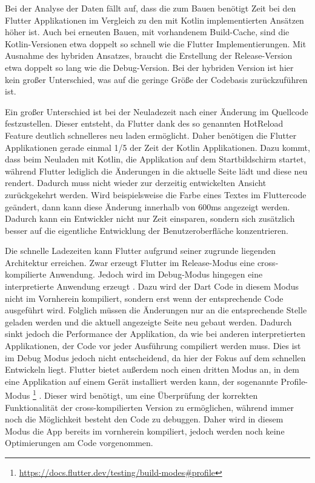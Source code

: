 Bei der Analyse der Daten fällt auf, dass die zum Bauen benötigt Zeit bei den Flutter Applikationen im Vergleich zu den mit Kotlin implementierten Ansätzen höher ist. 
Auch bei erneuten Bauen, mit vorhandenem Build-Cache, sind die Kotlin-Versionen etwa doppelt so schnell wie die Flutter Implementierungen.
Mit Ausnahme des hybriden Ansatzes, braucht die Erstellung der Release-Version etwa doppelt so lang wie die Debug-Version. 
Bei der hybriden Version ist hier kein großer Unterschied, was auf die geringe Größe der Codebasis zurückzuführen ist.

Ein großer Unterschied ist bei der Neuladezeit nach einer Änderung im Quellcode festzustellen. Dieser entsteht, da Flutter dank des so genannten HotReload Feature deutlich schnelleres neu laden ermöglicht. Daher benötigen die Flutter Applikationen gerade einmal 1/5 der Zeit der Kotlin Applikationen. Dazu kommt, dass beim Neuladen mit Kotlin, die Applikation auf dem Startbildschirm startet, während Flutter lediglich die Änderungen in die aktuelle Seite lädt und diese neu rendert. Dadurch muss nicht wieder zur derzeitig entwickelten Ansicht zurückgekehrt werden. Wird beispielsweise die Farbe eines Textes im Fluttercode geändert, dann kann diese Änderung innerhalb von 600ms angezeigt werden. Dadurch kann ein Entwickler nicht nur Zeit einsparen, sondern sich zusätzlich besser auf die eigentliche Entwicklung der Benutzeroberfläche konzentrieren.

Die schnelle Ladezeiten kann Flutter aufgrund seiner zugrunde liegenden Architektur erreichen. Zwar erzeugt Flutter im Release-Modus eine cross-kompilierte Anwendung. Jedoch wird im Debug-Modus hingegen eine interpretierte Anwendung erzeugt \cite{flutter_debug_dart}. Dazu wird der Dart Code in diesem Modus nicht im Vornherein kompiliert, sondern erst wenn der entsprechende Code ausgeführt wird. Folglich müssen die Änderungen nur an die entsprechende Stelle geladen werden und die aktuell angezeigte Seite neu gebaut werden. Dadurch sinkt jedoch die Performance der Applikation, da wie bei anderen interpretierten Applikationen, der Code vor jeder Ausführung compiliert werden muss. Dies ist im Debug Modus jedoch nicht entscheidend, da hier der Fokus auf dem schnellen Entwickeln liegt. Flutter bietet außerdem noch einen dritten Modus an, in dem eine Applikation auf einem Gerät installiert werden kann, der sogenannte Profile-Modus \footnote{\url{https://docs.flutter.dev/testing/build-modes\#profile}} \cite{flutter_debug_dart}. 
Dieser wird benötigt, um eine Überprüfung der korrekten Funktionalität der cross-kompilierten Version zu ermöglichen, während immer noch die Möglichkeit besteht den Code zu debuggen. Daher wird in diesem Modus die App bereits im vornherein kompiliert, jedoch werden noch keine Optimierungen am Code vorgenommen.

